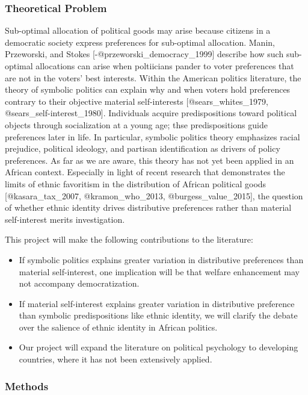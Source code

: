 \documentclass[]{article}
\title{}
\subtitle{Drivers of Distributive Preferences: Symbolic Politics vs Self-Interest
in Africa}
\author{Ethan Christensen \& Jenny Hamilton}
\date{April 23, 2018}
\begin{document}
\subsubsection{Theoretical Problem}\label{theoretical-problem}

Sub-optimal allocation of political goods may arise because citizens in
a democratic society express preferences for sub-optimal allocation.
Manin, Przeworski, and Stokes {[}-@przeworski\_democracy\_1999{]}
describe how such sub-optimal allocations can arise when poltiicians
pander to voter preferences that are not in the voters' best interests.
Within the American politics literature, the theory of symbolic politics
can explain why and when voters hold preferences contrary to their
objective material self-interests {[}@sears\_whites\_1979,
@sears\_self-interest\_1980{]}. Individuals acquire predispositions
toward political objects through socialization at a young age; thse
predispositions guide preferences later in life. In particular, symbolic
politics theory emphasizes racial prejudice, political ideology, and
partisan identification as drivers of policy preferences. As far as we
are aware, this theory has not yet been applied in an African context.
Especially in light of recent research that demonstrates the limits of
ethnic favoritism in the distribution of African political goods
{[}@kasara\_tax\_2007, @kramon\_who\_2013, @burgess\_value\_2015{]}, the
question of whether ethnic identity drives distributive preferences
rather than material self-interest merits investigation.

This project will make the following contributions to the literature:

\begin{itemize}
\item If symbolic politics explains greater variation in distributive preferences than material self-interest, one implication will be that welfare enhancement may not accompany democratization.
\item If material self-interest explains greater variation in distributive preference than symbolic predispositions like ethnic identity, we will clarify the debate over the salience of ethnic identity in African politics.
\item Our project will expand the literature on political psychology to developing countries, where it has not been extensively applied.
\end{itemize}

\subsubsection{Methods}\label{methods}
\end{document}
